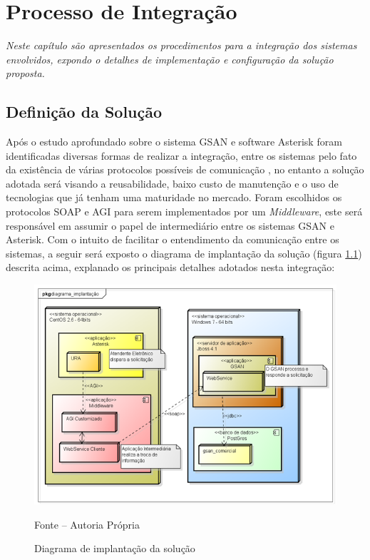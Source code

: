 \chapter[Processo de Integração]{\textbf{P}rocesso de \textbf{I}ntegração}

\textit{Neste capítulo são apresentados os procedimentos para a integração dos sistemas envolvidos, expondo o detalhes de implementação e configuração da solução proposta.}


\section{Definição da Solução}

Após o estudo aprofundado sobre o sistema GSAN e software Asterisk foram identificadas diversas formas de realizar a integração, entre os sistemas pelo fato da existência de várias protocolos possíveis de comunicação , no entanto a solução adotada será visando a reusabilidade, baixo custo de manutenção e o uso de tecnologias que já tenham uma maturidade no mercado. Foram escolhidos os protocolos SOAP e AGI para serem implementados por um \textit{Middleware}, este será responsável em assumir o papel de intermediário entre os sistemas GSAN e Asterisk. Com o intuito de facilitar o entendimento da comunicação entre os sistemas, a seguir será exposto o diagrama de implantação da solução (figura \ref{figura:diagramaImplantacao}) descrita acima, explanado os principais detalhes adotados nesta integração:

\begin{figure}[!htb]
	\centering
	\includegraphics{figuras/diagrama_implantacao.png}
	\caption{Diagrama de implantação da solução}
	\label{figura:diagramaImplantacao}	
	Fonte – Autoria Própria
\end{figure}


